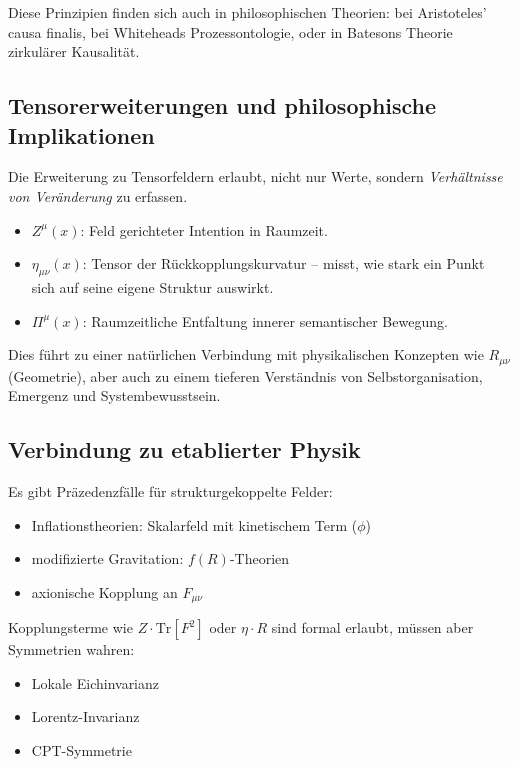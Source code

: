 \documentclass[11pt]{article}
\begin{document}
Diese Prinzipien finden sich auch in philosophischen Theorien: bei Aristoteles' causa finalis, bei Whiteheads Prozessontologie,  
oder in Batesons Theorie zirkulärer Kausalität.

\subsection*{Tensorerweiterungen und philosophische Implikationen}

Die Erweiterung zu Tensorfeldern erlaubt, nicht nur Werte, sondern \textit{Verhältnisse von Veränderung} zu erfassen.

\begin{itemize}
  \item $Z^\mu(x)$: Feld gerichteter Intention in Raumzeit.
  \item $\eta_{\mu\nu}(x)$: Tensor der Rückkopplungskurvatur -- misst, wie stark ein Punkt sich auf seine eigene Struktur auswirkt.
  \item $\Pi^\mu(x)$: Raumzeitliche Entfaltung innerer semantischer Bewegung.
\end{itemize}

Dies führt zu einer natürlichen Verbindung mit physikalischen Konzepten wie $R_{\mu\nu}$ (Geometrie),  
aber auch zu einem tieferen Verständnis von Selbstorganisation, Emergenz und Systembewusstsein.

\subsection*{Verbindung zu etablierter Physik}

Es gibt Präzedenzfälle für strukturgekoppelte Felder:

\begin{itemize}
  \item Inflationstheorien: Skalarfeld mit kinetischem Term ($\phi$)
  \item modifizierte Gravitation: $f(R)$-Theorien
  \item axionische Kopplung an $F_{\mu\nu}$
\end{itemize}

Kopplungsterme wie $Z \cdot \mathrm{Tr}[F^2]$ oder $\eta \cdot R$ sind formal erlaubt,  
müssen aber Symmetrien wahren:
\begin{itemize}
  \item Lokale Eichinvarianz
  \item Lorentz-Invarianz
  \item CPT-Symmetrie
\end{itemize}
\end{document}
